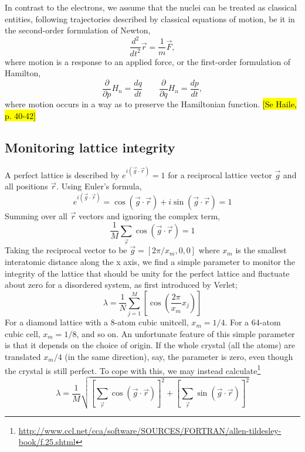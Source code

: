 \documentclass[11pt,bibliography=totoc,index=totoc]{scrbook}   %
\newcommand{\comment}[1]{\hl{#1}}
\begin{document}
In contrast to the electrons, we assume that the nuclei can be treated as classical entities, following trajectories described by 
classical equations of motion, be it in the
second-order formulation of Newton,
\begin{equation}
  \frac{d^2}{d t^2} \vec{r} = \frac{1}{m}\vec{F},
\end{equation}
where motion is a response to an applied force,
or the first-order formulation of Hamilton,
\begin{equation}
  \frac{\partial}{\partial p} H_n = \frac{dq}{dt} \qquad
  \frac{\partial}{\partial q} H_n = \frac{dp}{dt},
\end{equation}
where motion occurs in a way as to preserve the Hamiltonian function.
\comment{[Se Haile, p. 40-42]}

\subsection{Monitoring lattice integrity}

A perfect lattice is described by $e^{i(\vec{g}\cdot\vec{r})}=1$ for a reciprocal lattice vector $\vec{g}$ and all positions $\vec{r}$. 
Using Euler's formula,
\begin{equation}
    e^{i(\vec{g}\cdot\vec{r})} = \cos(\vec{g}\cdot\vec{r}) + i\sin(\vec{g}\cdot\vec{r}) = 1
\end{equation}
Summing over all $\vec{r}$ vectors and ignoring the complex term,
\begin{equation}
    \frac{1}{M}\sum_{\vec{r}} \cos(\vec{g}\cdot\vec{r}) = 1
\end{equation}
Taking the reciprocal vector to be $\vec{g}=[2\pi/x_m,0,0]$ where $x_m$ is the smallest interatomic distance along the x axis, we find a simple parameter to monitor the integrity of the lattice that should be unity for the perfect lattice and fluctuate about zero for a disordered system, as first introduced by Verlet;
\begin{equation}
  \lambda = \frac{1}{N} \sum_{j=1}^M  \left[ \cos\left( \frac{2\pi}{x_m} x_j \right)\right]
  \label{eq:simple_lattice_order_parameter}
\end{equation}
For a diamond lattice with a 8-atom cubic unitcell, $x_m=1/4$. For a 64-atom cubic cell, $x_m=1/8$, and so on.
An unfortunate feature of this simple parameter is that it depends on the choice of origin. 
If the whole crystal (all the atoms) are translated $x_m/4$ (in the same direction), say, the parameter is zero, even though the crystal is still perfect.
To cope with this, we may instead calculate\footnote{\url{http://www.ccl.net/cca/software/SOURCES/FORTRAN/allen-tildesley-book/f.25.shtml}}
\begin{equation}
  \lambda = \frac{1}{M}\sqrt{\left[\sum_{\vec{r}}\cos(\vec{g}\cdot\vec{r})\right]^2 + \left[\sum_{\vec{r}}\sin(\vec{g}\cdot\vec{r})\right]^2}
  \label{eq:lattice_order_parameter}
\end{equation}
\end{document}
